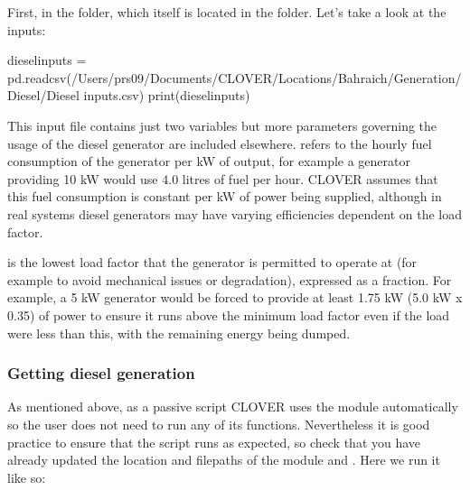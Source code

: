 \documentclass[letterpaper,10pt,english]{sphinxmanual}
\begin{document}
\sphinxAtStartPar
First,  in the 
folder, which itself is located in the  folder. Let’s take a
look at the inputs:

\begin{sphinxVerbatim}[commandchars=\\\{\}]
diesel\PYGZus{}inputs = pd.read\PYGZus{}csv(\PYGZdq{}/Users/prs09/Documents/CLOVER/Locations/Bahraich/Generation/Diesel/Diesel inputs.csv\PYGZdq{})
print(diesel\PYGZus{}inputs)
\end{sphinxVerbatim}

\begin{sphinxVerbatim}[commandchars=\\\{\}]
                 
           
\end{sphinxVerbatim}

\sphinxAtStartPar
This input file contains just two variables but more parameters
governing the usage of the diesel generator are included elsewhere.
 refers to the hourly fuel consumption of the
generator per kW of output, for example a generator providing 10 kW
would use 4.0 litres of fuel per hour. CLOVER assumes that this fuel
consumption is constant per kW of power being supplied, although in real
systems diesel generators may have varying efficiencies dependent on the
load factor.

\sphinxAtStartPar
{} is the lowest load factor that the generator is
permitted to operate at (for example to avoid mechanical issues or
degradation), expressed as a fraction. For example, a 5 kW generator
would be forced to provide at least 1.75 kW (5.0 kW x 0.35) of power to
ensure it runs above the minimum load factor even if the load were less
than this, with the remaining energy being dumped.


\subsubsection{Getting diesel generation}
\label{\detokenize{electricity_generation:getting-diesel-generation}}
\sphinxAtStartPar
As mentioned above, as a passive script CLOVER uses the  module
automatically so the user does not need to run any of its functions.
Nevertheless it is good practice to ensure that the script runs as
expected, so check that you have already updated the location and
filepaths of the  module and . Here we run it like so:
\end{document}
